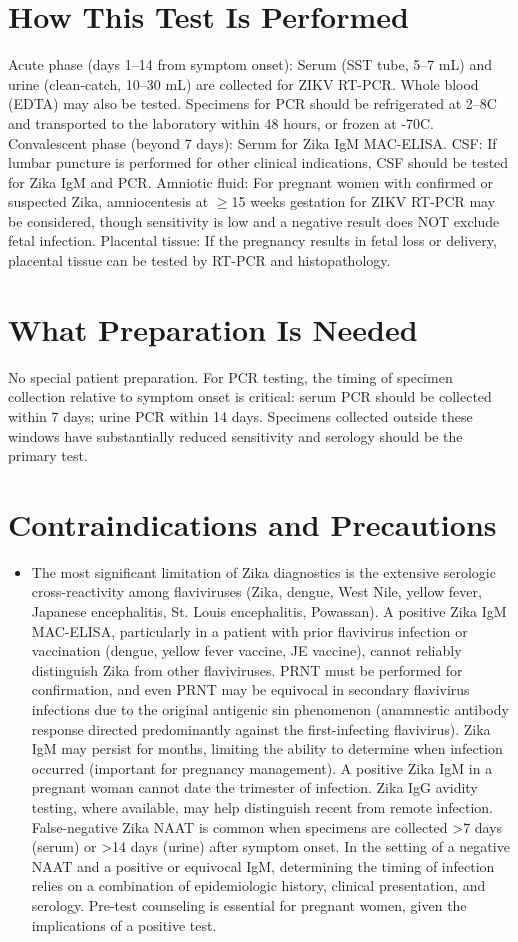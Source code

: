 \section*{How This Test Is Performed}
Acute phase (days 1--14 from symptom onset): Serum (SST tube, 5--7 mL) and urine (clean-catch, 10--30 mL) are collected for ZIKV RT-PCR. Whole blood (EDTA) may also be tested. Specimens for PCR should be refrigerated at 2--8\textdegree{}C and transported to the laboratory within 48 hours, or frozen at -70\textdegree{}C. Convalescent phase (beyond 7 days): Serum for Zika IgM MAC-ELISA. CSF: If lumbar puncture is performed for other clinical indications, CSF should be tested for Zika IgM and PCR. Amniotic fluid: For pregnant women with confirmed or suspected Zika, amniocentesis at $\geq$15 weeks gestation for ZIKV RT-PCR may be considered, though sensitivity is low and a negative result does NOT exclude fetal infection. Placental tissue: If the pregnancy results in fetal loss or delivery, placental tissue can be tested by RT-PCR and histopathology.

\section*{What Preparation Is Needed}
No special patient preparation. For PCR testing, the timing of specimen collection relative to symptom onset is critical: serum PCR should be collected within 7 days; urine PCR within 14 days. Specimens collected outside these windows have substantially reduced sensitivity and serology should be the primary test.

\section*{Contraindications and Precautions}
\begin{itemize}
  \item The most significant limitation of Zika diagnostics is the extensive serologic cross-reactivity among flaviviruses (Zika, dengue, West Nile, yellow fever, Japanese encephalitis, St. Louis encephalitis, Powassan). A positive Zika IgM MAC-ELISA, particularly in a patient with prior flavivirus infection or vaccination (dengue, yellow fever vaccine, JE vaccine), cannot reliably distinguish Zika from other flaviviruses. PRNT must be performed for confirmation, and even PRNT may be equivocal in secondary flavivirus infections due to the original antigenic sin phenomenon (anamnestic antibody response directed predominantly against the first-infecting flavivirus). Zika IgM may persist for months, limiting the ability to determine when infection occurred (important for pregnancy management). A positive Zika IgM in a pregnant woman cannot date the trimester of infection. Zika IgG avidity testing, where available, may help distinguish recent from remote infection. False-negative Zika NAAT is common when specimens are collected >7 days (serum) or >14 days (urine) after symptom onset. In the setting of a negative NAAT and a positive or equivocal IgM, determining the timing of infection relies on a combination of epidemiologic history, clinical presentation, and serology. Pre-test counseling is essential for pregnant women, given the implications of a positive test.
\end{itemize}
